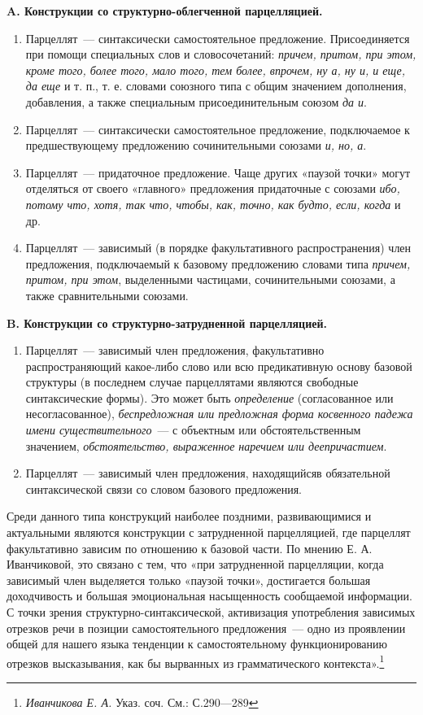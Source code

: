 \documentclass{kursa4}
\begin{document}
      {\centering
      \textbf{A. Конструкции со структурно-облегченной парцелляцией.}}
      \begin{enumerate}
        \item Парцеллят~--- синтаксически самостоятельное предложение. Присоединяется при помощи специальных слов и словосочетаний: \textit{причем, притом, при этом, кроме того, более того, мало того, тем более, впрочем, ну а, ну и, и еще, да еще} и т. п., т. е. словами союзного типа с общим значением дополнения, добавления, а также специальным присоединительным союзом \textit{да и}. \item Парцеллят~--- синтаксически самостоятельное предложение, подключаемое к предшествующему предложению сочинительными союзами \textit{и, но, а}. \item Парцеллят~--- придаточное предложение. Чаще других «паузой точки» могут отделяться от своего «главного» предложения придаточные с союзами \textit{ибо, потому что, хотя, так что, чтобы, как, точно, как будто, если, когда}
        и др. \item Парцеллят~--- зависимый (в порядке факультативного распространения) член предложения, подключаемый к базовому предложению словами типа \textit{причем, притом, при этом}, выделенными частицами, сочинительными союзами, а также сравнительными союзами. \end{enumerate}

      {\centering\textbf{B. Конструкции со структурно-затрудненной парцелляцией.}}
      \begin{enumerate}
        \item {Парцеллят~--- зависимый член предложения, факультативно распространяющий какое-либо слово или всю предикативную основу базовой структуры (в последнем случае парцеллятами являются свободные синтаксические формы). Это может быть
        }\textit{определение}
        (согласованное или несогласованное), \textit{беспредложная или предложная форма косвенного падежа имени существительного}~--- с объектным или обстоятельственным значением, \textit{обстоятельство, выраженное наречием или деепричастием}. \item {Парцеллят~--- зависимый член предложения, находящийся}в обязательной синтаксической связи со словом базового предложения. \end{enumerate}

      Среди данного типа конструкций наиболее поздними, развивающимися и актуальными являются конструкции с затрудненной парцелляцией, где парцеллят факультативно зависим по отношению к базовой части. По мнению Е. А. Иванчиковой, это связано с тем, что «при затрудненной парцелляции, когда зависимый член выделяется только «паузой точки», достигается большая доходчивость и большая эмоциональная насыщенность сообщаемой информации. С точки зрения структурно-синтаксической, активизация употребления зависимых отрезков речи в позиции самостоятельного предложения~--- одно из проявлении общей для нашего языка тенденции к самостоятельному функционированию отрезков высказывания, как бы вырванных из грамматического контекста».\footnote{\textit{ Иванчикова Е. А. }{Указ. соч. См.: С.290—289}}
\end{document}
